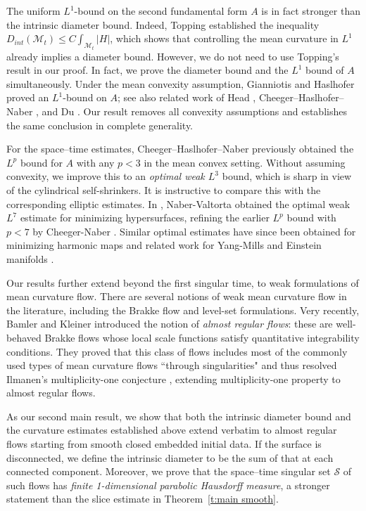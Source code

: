 \documentclass[11pt,reqno]{amsart}
\numberwithin{equation}{section}
\newcommand{\cM}{\mathcal{M}}
\newcommand{\cS}{\mathcal{S}}
\theoremstyle{definition}
\theoremstyle{remark}
\theoremstyle{remark}
\theoremstyle{remark}
\theoremstyle{remark}\newtheorem{conjecture}[equation]{Conjecture}
\theoremstyle{remark}\newtheorem{question}[equation]{Question}
\begin{document}
The uniform $L^1$-bound on the second fundamental form $A$ is in fact stronger than the intrinsic diameter bound. Indeed, Topping \cite{To08} established the inequality $D_{int}(\cM_t) \le C \int_{\cM_t} |H|$, which shows that controlling the mean curvature in $L^1$ already implies a diameter bound.  However, we do not need to use Topping's result in our proof. In fact, we prove the diameter bound and the $L^1$ bound of $A$ simultaneously. Under the mean convexity assumption,  Gianniotis  and Haslhofer \cite{GH20} proved an $L^1$-bound on $A$; see also related work of Head \cite{He13}, Cheeger–Haslhofer–Naber \cite{CHN13}, and Du \cite{Du21}. Our result removes all convexity assumptions and establishes the same conclusion in complete generality. 

For the space–time estimates, Cheeger–Haslhofer–Naber \cite{CHN13} previously obtained the $L^p$ bound for $A$ with any $p<3$ in the mean convex setting. Without assuming convexity, we improve this to an \emph{optimal weak 
$L^3$} bound, which is sharp in view of the cylindrical self-shrinkers. It is instructive to compare this with the corresponding elliptic estimates. In \cite{NV20}, Naber-Valtorta obtained the optimal weak $L^7$ estimate for minimizing hypersurfaces, refining the earlier $L^p$ bound with $p<7$ by Cheeger-Naber \cite{CN13}. Similar optimal estimates have since been obtained for minimizing harmonic maps \cite{NV17} and related work for Yang-Mills and Einstein manifolds \cite{NV19,JN21}.  

Our results further extend beyond the first singular time, to weak formulations of mean curvature flow. There are several notions of weak mean curvature flow in the literature, including the Brakke flow and level-set formulations. Very recently, Bamler and Kleiner \cite{BK23} introduced the notion of \emph{almost regular flows}: these are well-behaved Brakke flows whose local scale functions satisfy quantitative integrability conditions. They proved that this class of flows includes most of the commonly used types of mean curvature flows “through singularities" and thus resolved Ilmanen’s multiplicity-one conjecture \cite{Il95}, extending multiplicity-one property to almost regular flows.

As our second main result, we show that both the intrinsic diameter bound and the curvature estimates established above extend verbatim to almost regular flows starting from smooth closed embedded initial data. If the surface is disconnected, we define the intrinsic diameter to be the sum of that at each connected component. Moreover, we prove that the space–time singular set $\cS$ of such flows has \emph{finite 1-dimensional parabolic Hausdorff measure}, a stronger statement than the slice estimate in Theorem~\ref{t:main smooth}.
\end{document}
